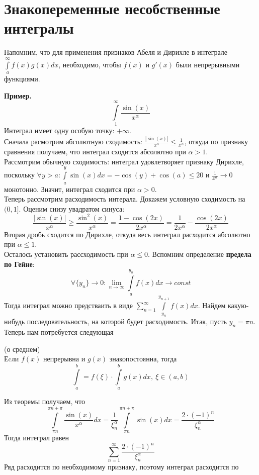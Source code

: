 \section{Знакопеременные несобственные интегралы}
Напомним, что для применения признаков Абеля и Дирихле в интеграле 
$\int\limits_{a}^{\infty} f(x)g(x)dx$, необходимо, чтобы $f(x)$ и $g'(x)$ были 
непрерывными функциями.

\textbf{Пример.} $$\int\limits_{1}^{\infty}\frac{\sin(x)}{x^\alpha}$$ 
Интеграл имеет одну особую точку: $+\infty$.\\
Сначала расмотрим абсолютную сходимость: 
$\frac{|\sin(x)|}{x^\alpha}\leqslant \frac{1}{x^\alpha}$, откуда
по признаку сравнения получаем, что интеграл сходится абсолютно при 
$\alpha>1$.\\
Рассмотрим обычную сходимость: интеграл удовлетворяет признаку Дирихле,
поскольку 
$\forall y>a: \int\limits_{a}^{y}\sin(x)dx=-\cos(y)+\cos(a)\leqslant 20$ и
$\frac{1}{x^\alpha}\to 0$ монотонно. Значит, интеграл сходится при 
$\alpha>0$.\\
Теперь рассмотрим расходимость интерала. Докажем условную сходимость на
$(0,1]$.
Оценим снизу увадратом синуса:
$$\frac{|\sin(x)|}{x^\alpha}\geqslant \frac{\sin^2(x)}{x^\alpha}=
\frac{1-\cos(2x)}{2x^\alpha}=\frac{1}{2x^\alpha}-\frac{\cos(2x)}{2x^\alpha}$$ 
Вторая дробь сходится по Дирихле, откуда весь интеграл расходится абсолютно
при $\alpha\leqslant 1$.\\
Осталось установить рассходимость при $\alpha\leqslant 0$. Вспомним определение
\textbf{предела по Гейне}:
$$\forall \{y_n\}\to 0: \lim\limits_{n \to \infty} \int\limits_{a}^{y_n}
f(x)dx\to const$$ 
Тогда интеграл можно предстваить в виде $\sum\limits_{n=1}^{\infty} 
\int\limits_{y_n}^{y_{n+1}}f(x)dx$. Найдем какую-нибудь последовательность,
на которой будет расходимость. Итак, пусть $y_n=\pi n$.\\
Теперь нам потребуется следующая 
\begin{theor}(о среднем)\\
Еcли $f(x)$ непрерывна и  $g(x)$ знакопостоянна, тогда
$$\int\limits_{a}^{b}=f(\xi)\cdot\int\limits_{a}^{b} g(x)dx,~\xi\in(a,b)$$
\end{theor}
Из теоремы получаем, что
$$\int\limits_{\pi n}^{\pi n+\pi} \frac{\sin(x)}{x^\alpha}dx = 
\frac{1}{\xi^\alpha_n}\int\limits_{\pi n}^{\pi n+\pi}\sin(x)dx = 
\frac{2\cdot (-1)^n}{\xi^\alpha_n}$$ 
Тогда интеграл равен
$$\sum\limits_{n=1}^{\infty}\frac{2\cdot (-1)^n}{\xi^\alpha_n}$$
Ряд расходится по необходимому признаку, поэтому интеграл расходится по 
